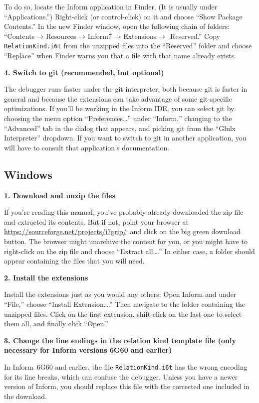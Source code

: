 \documentclass{book}
\newcommand{\lastpagebreak}{\vfill\pagebreak}
\newcommand{\downloadurl}{\url{https://sourceforge.net/projects/i7grip/}}
\newcommand{\downloadclick}{click on the big green download button}
\newcommand{\nil}{{\null}}
\newcommand{\thento}{\(\nil\rightarrow\nil\)}
\begin{document}
To do so, locate the Inform application in Finder.  (It is usually under
``Applications.'')  Right-click (or control-click) on it and choose ``Show
Package Contents.''  In the new Finder window, open the following chain of
folders: ``Contents\thento Resources\thento Inform7\thento Extensions\thento
Reserved.''  Copy \texttt{RelationKind.i6t} from the unzipped files into the
``Reserved'' folder and choose ``Replace'' when Finder warns you that a file
with that name already exists.

\textbf{4. Switch to git (recommended, but optional)}

The debugger runs faster under the git interpreter, both because git is faster
in general and because the extensions can take advantage of some git-specific
optimizations.  If you'll be working in the Inform IDE, you can select git by
choosing the menu option ``Preferences\dots'' under ``Inform,'' changing to the
``Advanced'' tab in the dialog that appears, and picking git from the ``Glulx
Interpreter'' dropdown.  If you want to switch to git in another application,
you will have to consult that application's documentation.

\lastpagebreak

\subsection{Windows}

\textbf{1. Download and unzip the files}

If you're reading this manual, you've probably already downloaded the zip file
and extracted its contents.  But if not, point your browser at \downloadurl\ and
\downloadclick.  The browser might unarchive the content for you, or you might
have to right-click on the zip file and choose ``Extract all\dots.''  In either
case, a folder should appear containing the files that you will need.

\textbf{2. Install the extensions}

Install the extensions just as you would any others: Open Inform and under
``File,'' choose ``Install Extension\dots.''  Then navigate to the folder
containing the unzipped files.  Click on the first extension, shift-click on the
last one to select them all, and finally click ``Open.''

\textbf{3. Change the line endings in the relation kind template file (only
  necessary for Inform versions 6G60 and earlier)}

In Inform~6G60 and earlier, the file \texttt{RelationKind.i6t} has the wrong
encoding for its line breaks, which can confuse the debugger.  Unless you have a
newer version of Inform, you should replace this file with the corrected one
included in the download.
\end{document}
